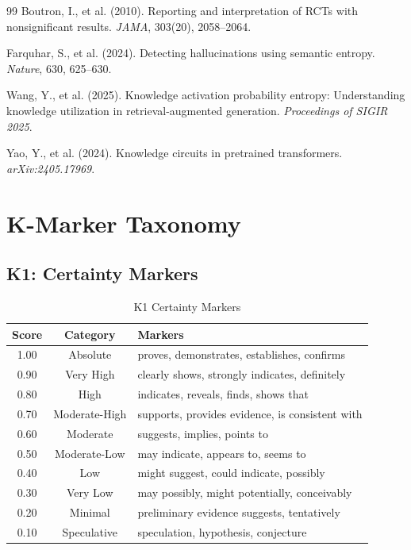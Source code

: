 \begin{thebibliography}{99}
Boutron, I., et al. (2010). Reporting and interpretation of RCTs with nonsignificant results. \emph{JAMA}, 303(20), 2058--2064.

Farquhar, S., et al. (2024). Detecting hallucinations using semantic entropy. \emph{Nature}, 630, 625--630.

Wang, Y., et al. (2025). Knowledge activation probability entropy: Understanding knowledge utilization in retrieval-augmented generation. \emph{Proceedings of SIGIR 2025}.

Yao, Y., et al. (2024). Knowledge circuits in pretrained transformers. \emph{arXiv:2405.17969}.

\end{thebibliography}



\newpage
\appendix

\section{K-Marker Taxonomy}
\label{app:kmarkers}

\subsection{K1: Certainty Markers}

\begin{table}[H]
\centering
\small
\begin{tabular}{ccl}
\toprule
\textbf{Score} & \textbf{Category} & \textbf{Markers} \\
\midrule
1.00 & Absolute & proves, demonstrates, establishes, confirms \\
0.90 & Very High & clearly shows, strongly indicates, definitely \\
0.80 & High & indicates, reveals, finds, shows that \\
0.70 & Moderate-High & supports, provides evidence, is consistent with \\
0.60 & Moderate & suggests, implies, points to \\
0.50 & Moderate-Low & may indicate, appears to, seems to \\
0.40 & Low & might suggest, could indicate, possibly \\
0.30 & Very Low & may possibly, might potentially, conceivably \\
0.20 & Minimal & preliminary evidence suggests, tentatively \\
0.10 & Speculative & speculation, hypothesis, conjecture \\
\bottomrule
\end{tabular}
\caption{K1 Certainty Markers}
\end{table}



